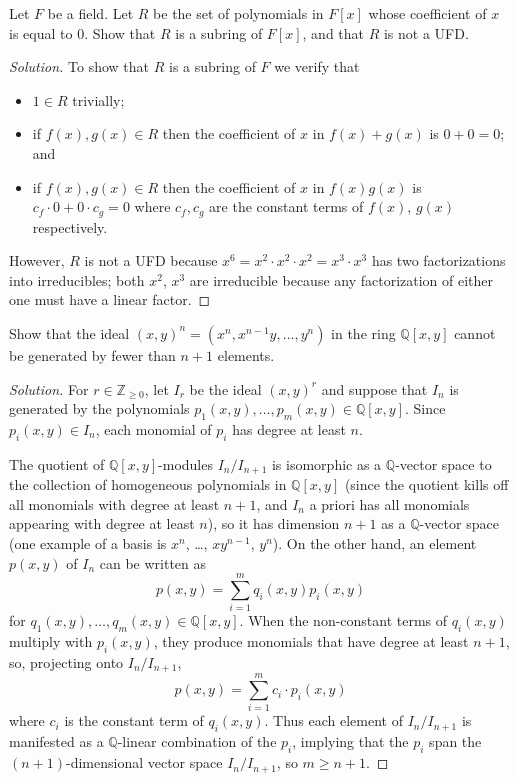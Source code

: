 \documentclass[10pt]{article}
\providecommand{\QQ}{\mathbb Q}
\providecommand{\ZZ}{\mathbb Z}
\providecommand{\ii}{\item}
\newenvironment{soln}{\begin{proof}[Solution]}{\end{proof}}
\begin{document}
\pagebreak

\begin{problem}
    Let $F$ be a field. Let $R$ be the set of polynomials in $F[x]$
    whose coefficient of $x$ is equal to $0$.
    Show that $R$ is a subring of $F[x]$, and that $R$ is not a UFD.
\end{problem}

\begin{soln}
    To show that $R$ is a subring of $F$ we verify that
    \begin{itemize}
        \ii $1\in R$ trivially;
	\ii if $f(x),g(x)\in R$ then the coefficient of $x$ in
	$f(x) + g(x)$ is $0 + 0 = 0$; and
	\ii if $f(x),g(x)\in R$ then the coefficient of $x$ in
	$f(x)g(x)$ is $c_f\cdot 0 + 0\cdot c_g = 0$
	where $c_f,c_g$ are the constant terms of $f(x)$, $g(x)$ respectively.
    \end{itemize}
    However, $R$ is not a UFD because
    $x^6 = x^2\cdot x^2\cdot x^2 = x^3\cdot x^3$
    has two factorizations into irreducibles;
    both $x^2$, $x^3$ are irreducible because any factorization
    of either one must have a linear factor.
\end{soln}

\begin{problem}
    Show that the ideal $(x,y)^n = (x^n, x^{n-1}y, \dots, y^n)$
    in the ring $\QQ[x,y]$ cannot be generated by fewer than $n+1$ elements.
\end{problem}

\begin{soln}
    For $r\in\ZZ_{\ge0}$, let $I_r$ be the ideal $(x,y)^r$
    and suppose that $I_n$ is generated by the polynomials
    $p_1(x,y),\dots,p_m(x,y)\in\QQ[x,y]$.
    Since $p_i(x,y)\in I_n$, each monomial of $p_i$
    has degree at least $n$.

    The quotient of $\QQ[x,y]$-modules $I_n/I_{n+1}$ is isomorphic
    as a $\QQ$-vector space to the collection of
    homogeneous polynomials in $\QQ[x,y]$
    (since the quotient kills off all monomials with degree at least $n+1$,
    and $I_n$ a priori has all monomials appearing with degree at least $n$),
    so it has dimension $n + 1$ as a $\QQ$-vector space
    (one example of a basis is $x^n$, \dots, $xy^{n-1}$, $y^n$).
    On the other hand, an element $p(x,y)$ of $I_n$ can be written as
    \begin{equation*}
	p(x,y) = \sum_{i=1}^m q_i(x,y)p_i(x,y)
    \end{equation*}
    for $q_1(x,y),\dots,q_m(x,y)\in\QQ[x,y]$.
    When the non-constant terms of $q_i(x,y)$
    multiply with $p_i(x,y)$, they produce monomials that have degree
    at least $n+1$, so, projecting onto $I_n/I_{n+1}$,
    \begin{equation*}
	p(x,y) = \sum_{i=1}^m c_i\cdot p_i(x,y)
    \end{equation*}
    where $c_i$ is the constant term of $q_i(x,y)$.
    Thus each element of $I_n/I_{n+1}$ is manifested as a $\QQ$-linear
    combination of the $p_i$, implying that the $p_i$ span
    the $(n+1)$-dimensional vector space $I_n/I_{n+1}$, so $m\ge n+1$.
\end{soln}
\end{document}
